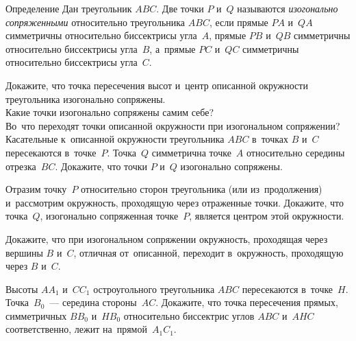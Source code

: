 


\begin{claim}{Определение}
Дан треугольник $ABC$.
Две точки $P$ и~$Q$ называются \emph{изогонально сопряженными} относительно
треугольника $ABC$, если
прямые $PA$ и~$QA$ симметричны относительно биссектрисы угла~$A$,
прямые $PB$ и~$QB$ симметричны относительно биссектрисы угла~$B$,
а~прямые $PC$ и~$QC$ симметричны относительно биссектрисы угла~$C$.
\end{claim}

\begin{problems}

\item
\subproblem
Докажите, что точка пересечения высот и~центр описанной окружности треугольника
изогонально сопряжены.
\\
\subproblem
Какие точки изогонально сопряжены самим себе?
\\
\subproblem
Во~что переходят точки описанной окружности при изогональном сопряжении?
\\
\subproblem
Касательные к~описанной окружности треугольника $ABC$ в~точках $B$ и~$C$
пересекаются в~точке~$P$.
Точка~$Q$ симметрична точке~$A$ относительно середины отрезка~$BC$.
Докажите, что точки $P$ и~$Q$ изогонально сопряжены.

\item
Отразим точку~$P$ относительно сторон треугольника (или из~продолжения)
и~рассмотрим окружность, проходящую через отраженные точки.
Докажите, что точка~$Q$, изогонально сопряженная точке~$P$, является центром
этой окружности.

\item
Докажите, что при изогональном сопряжении окружность, проходящая через вершины
$B$ и~$C$, отличная от~описанной, переходит в~окружность, проходящую
через $B$ и~$C$.

\item
Высоты $AA_{1}$ и~$CC_{1}$ остроугольного треугольника $ABC$ пересекаются
в~точке~$H$.
Точка~$B_{0}$~--- середина стороны~$AC$.
Докажите, что точка пересечения прямых, симметричных $BB_{0}$ и~$HB_{0}$
относительно биссектрис углов $ABC$ и~$AHC$ соответственно, лежит
на~прямой~$A_{1}C_{1}$.


\end{problems}
